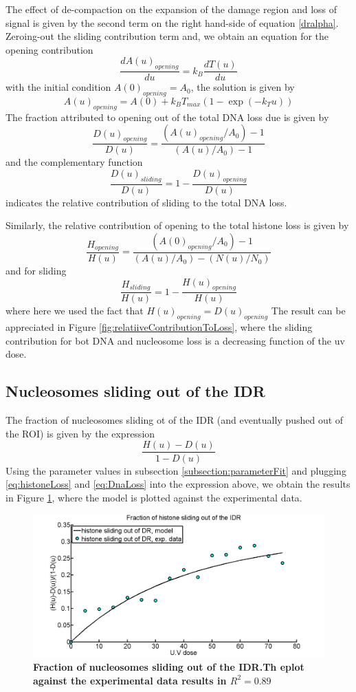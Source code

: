 \documentclass[12pt]{article}
\begin{document}
The effect of de-compaction on the expansion of the damage region and loss of signal is given by the second term on the right hand-side of equation \ref{dralpha}. Zeroing-out the sliding contribution term and,  we obtain an equation for the opening contribution 
\begin{equation*}
\frac{dA(u)_{opening}}{du}=k_B\frac{dT(u)}{du}
\end{equation*}
with the initial condition $A(0)_{opening}=A_0$, the solution is given by
\begin{equation}
A(u)_{opening}= A(0)+k_BT_{max}(1-\exp(-k_Tu))
\end{equation}
The fraction attributed to opening out of the total DNA loss due is given by 
\begin{equation}\label{eq:openingContributionDNA}
\frac{D(u)_{opening}}{D(u)}=\frac{\left(A(u)_{opening}/A_0\right)-1}{\left(A(u)/A_0\right) -1}
\end{equation}
and the complementary function 
\begin{equation}\label{eq:slidingContributionDNA}
\frac{D(u)_{sliding}}{D(u)}=1-\frac{D(u)_{opening}}{D(u)}
\end{equation}
indicates the relative contribution of sliding to the total DNA loss. 

Similarly, the relative contribution of opening to the total histone loss is given by 
\begin{equation}\label{eq:openingContributionHistones}
\frac{H_{opening}}{H(u)} =\frac{\left(A(0)_{opening}/A_0\right)-1}{(A(u)/A_0)-(N(u)/N_0)}
\end{equation}
and for sliding
\begin{equation}\label{eq:slidingContributionHistones}
\frac{H_{sliding}}{H(u)} = 1-\frac{H(u)_{opening}}{H(u)} 
\end{equation}
where here we used the fact that $H(u)_{opening}=D(u)_{opening}$
The result can be appreciated in Figure \ref{fig:relatiiveContributionToLoss}, where the sliding contribution for bot DNA and nucleosome loss is a decreasing function of the uv dose. 

\subsection{Nucleosomes sliding out of the IDR}
The fraction of nucleosomes sliding ot of the IDR (and eventually pushed out of the ROI) is given by the expression 
\begin{equation}
\frac{H(u)-D(u)}{1-D(u)}
\end{equation}
Using the parameter values in subsection \ref{subsection:parameterFit} and plugging \ref{eq:histoneLoss} and \ref{eq:DnaLoss} into the expression above, we obtain the results in Figure \ref{fig:fractionSlidingOutOfIDR}, where the model is plotted against the experimental data. 

\begin{figure}[H]
\centering
\includegraphics[width=0.5\linewidth, height=0.3\textheight]{fractionSlidingOutOfIDR}
\caption{\textbf{Fraction of nucleosomes sliding out of the IDR.Th eplot against the experimental data results in $R^2=0.89$ }}
\label{fig:fractionSlidingOutOfIDR}
\end{figure}
\end{document}
